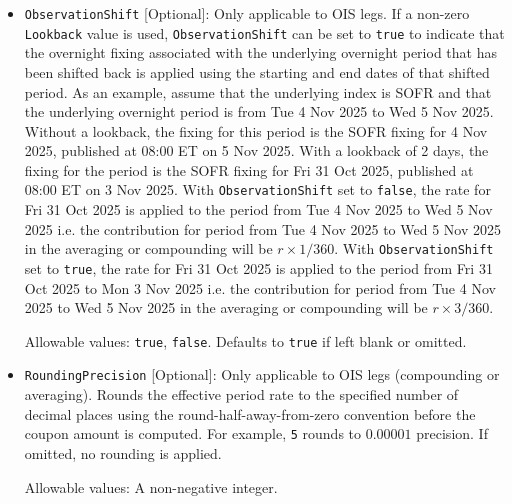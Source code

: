 \begin{itemize}
\item \lstinline!ObservationShift! [Optional]: Only applicable to OIS legs. If a non-zero \lstinline!Lookback! value 
is used, \lstinline!ObservationShift! can be set to \lstinline!true! to indicate that the overnight fixing associated 
with the underlying overnight period that has been shifted back is applied using the starting and end dates of that 
shifted period. As an example, assume that the underlying index is SOFR and that the underlying overnight period is 
from Tue 4 Nov 2025 to Wed 5 Nov 2025. Without a lookback, the fixing for this period is the SOFR fixing for 4 Nov 2025, 
published at 08:00 ET on 5 Nov 2025. With a lookback of 2 days, the fixing for the period is the SOFR fixing for Fri 
31 Oct 2025, published at 08:00 ET on 3 Nov 2025. With \lstinline!ObservationShift! set to \lstinline!false!, the rate 
for Fri 31 Oct 2025 is applied to the period from Tue 4 Nov 2025 to Wed 5 Nov 2025 i.e. the contribution for period 
from Tue 4 Nov 2025 to Wed 5 Nov 2025 in the averaging or compounding will be $r \times 1 / 360$. With 
\lstinline!ObservationShift! set to \lstinline!true!, the rate for Fri 31 Oct 2025 is applied to the period from 
Fri 31 Oct 2025 to Mon 3 Nov 2025 i.e. the contribution for period from Tue 4 Nov 2025 to Wed 5 Nov 2025 in the 
averaging or compounding will be $r \times 3 / 360$.

  Allowable values: \lstinline!true!, \lstinline!false!. Defaults to \lstinline!true! if left blank or omitted.

\item \lstinline!RoundingPrecision! [Optional]: Only applicable to OIS legs (compounding or averaging). Rounds the effective 
period rate to the specified number of decimal places using the round-half-away-from-zero convention before the coupon amount is computed. 
For example, \lstinline!5! rounds to $0.00001$ precision.  If omitted, no rounding is applied.

  Allowable values: A non-negative integer.

\end{itemize}
